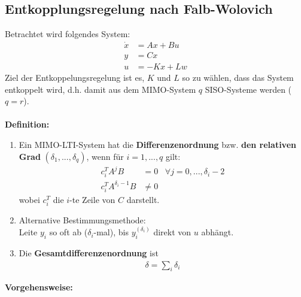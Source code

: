 \documentclass[a4paper,twocolumn,10pt]{article}
\begin{document}
\subsection{Entkopplungsregelung nach Falb-Wolovich}
Betrachtet wird folgendes System:
\begin{align*}
\dot{x}&=Ax+Bu\\
y&=Cx\\
u&=-Kx+Lw
\end{align*}
Ziel der Entkoppelungsregelung ist es, $K$ und $L$ so zu wählen, dass das System entkoppelt wird, d.h. damit aus dem MIMO-System $q$ SISO-Systeme werden ($q=r$).\\\\
\textbf{Definition:}
\begin{enumerate}[label=$\bullet$]
\item Ein MIMO-LTI-System hat die \textbf{Differenzenordnung} bzw. \textbf{den relativen Grad} $(\delta_1,...,\delta_q)$, wenn für $i=1,...,q$ gilt:
\begin{align*}
c_i^TA^jB&=0\;\;\;\forall j=0,...,\delta_i-2\\
c_i^TA^{\delta_i-1}B&\neq 0
\end{align*}
wobei $c_i^T$ die $i$-te Zeile von $C$ darstellt.
\item Alternative Bestimmungsmethode:\\
Leite $y_i$ so oft ab ($\delta_i$-mal), bis $y_i^{(\delta_i)}$ direkt von $u$ abhängt.
\item Die \textbf{Gesamtdifferenzenordnung} ist
\begin{align*}
\delta =\sum\limits_i \delta_i
\end{align*}
\end{enumerate}
\textbf{Vorgehensweise:}
\end{document}
